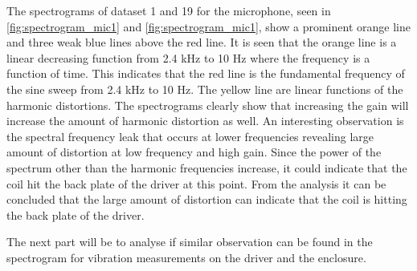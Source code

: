 %	
%	

The spectrograms of dataset 1 and 19 for the microphone, seen in \autoref{fig:spectrogram_mic1} and \autoref{fig:spectrogram_mic1}, show a prominent orange line and three weak blue lines above the red line. It is seen that the orange line is a linear decreasing function from 2.4 kHz to 10 Hz where the frequency is a function of time. This indicates that the red line is the fundamental frequency of the sine sweep from 2.4 kHz to 10 Hz. The yellow line are linear functions of the harmonic distortions. The spectrograms clearly show that increasing the gain will increase the amount of harmonic distortion as well. An interesting observation is the spectral frequency leak that occurs at lower frequencies revealing large amount of distortion at low frequency and high gain. Since the power of the spectrum other than the harmonic frequencies increase, it could indicate that the coil hit the back plate of the driver at this point. From the analysis it can be concluded that the large amount of distortion can indicate that the coil is hitting the back plate of the driver.

The next part will be to analyse if similar observation can be found in the spectrogram for vibration measurements on the driver and the enclosure. 

%	
%	

